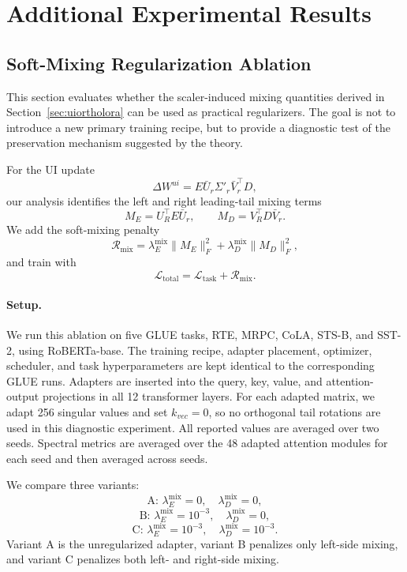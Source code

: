 \documentclass{article}
\begin{document}
\section{Additional Experimental Results}
\label{app:additional_experimental_results}

\subsection{Soft-Mixing Regularization Ablation}
\label{app:soft_mixing_ablation}

This section evaluates whether the scaler-induced mixing quantities derived in
Section~\ref{sec:uiortholora} can be used as practical regularizers. The goal is
not to introduce a new primary training recipe, but to provide a diagnostic test
of the preservation mechanism suggested by the theory.

For the UI update
\[
\Delta W^{ui}
=
E \bar{U}_r \Sigma'_r \bar{V}_r^\top D,
\]
our analysis identifies the left and right leading-tail mixing terms
\[
M_E = U_R^\top E \bar{U}_r,
\qquad
M_D = V_R^\top D \bar{V}_r.
\]
We add the soft-mixing penalty
\[
\mathcal{R}_{\mathrm{mix}}
=
\lambda_E^{\mathrm{mix}}\|M_E\|_F^2
+
\lambda_D^{\mathrm{mix}}\|M_D\|_F^2,
\]
and train with
\[
\mathcal{L}_{\mathrm{total}}
=
\mathcal{L}_{\mathrm{task}}
+
\mathcal{R}_{\mathrm{mix}}.
\]

\paragraph{Setup.}
We run this ablation on five GLUE tasks, RTE, MRPC, CoLA, STS-B, and
SST-2, using RoBERTa-base. The training recipe, adapter placement,
optimizer, scheduler, and task hyperparameters are kept identical to the
corresponding GLUE runs. Adapters are inserted into the query, key, value, and
attention-output projections in all 12 transformer layers. For each adapted
matrix, we adapt 256 singular values and set \(k_{vec}=0\), so no orthogonal
tail rotations are used in this diagnostic experiment. All reported values are averaged over two seeds. Spectral metrics are averaged over the 48 adapted attention
modules for each seed and then averaged across seeds.

We compare three variants:
\[
\text{A: } \lambda_E^{\mathrm{mix}}=0,\quad \lambda_D^{\mathrm{mix}}=0,
\]
\[
\text{B: } \lambda_E^{\mathrm{mix}}=10^{-3},\quad
\lambda_D^{\mathrm{mix}}=0,
\]
\[
\text{C: } \lambda_E^{\mathrm{mix}}=10^{-3},\quad
\lambda_D^{\mathrm{mix}}=10^{-3}.
\]
Variant A is the unregularized adapter, variant B penalizes only left-side
mixing, and variant C penalizes both left- and right-side mixing.
\end{document}
